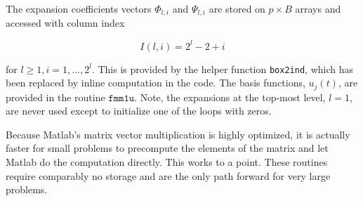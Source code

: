 The expansion coefficients vectors $\Phi_{l,i}$ and $\Psi_{l,i}$ are stored on $p \times B$ arrays and accessed with column index

\begin{equation}
I(l,i) = 2^l - 2 + i
\end{equation}

\noindent for $ l \ge 1, i = 1,...,2^l $.  This is provided by the helper function \texttt{box2ind}, which has been replaced by inline computation in the code.  The basis functions, $u_j(t)$, are provided in the routine $\texttt{fmm1u}$.  Note, the expansions at the top-most level, $l=1$, are never used except to initialize one of the loops with zeros.  

Because Matlab's matrix vector multiplication is highly optimized, it is actually faster for small problems to precompute the elements of the matrix and let Matlab do the computation directly.  This works to a point.  These routines require comparably no storage and are the only path forward for very large problems.

{\footnotesize
{}
}

{\footnotesize
{}
}

{\footnotesize
{}
}

{\footnotesize
{}
}
